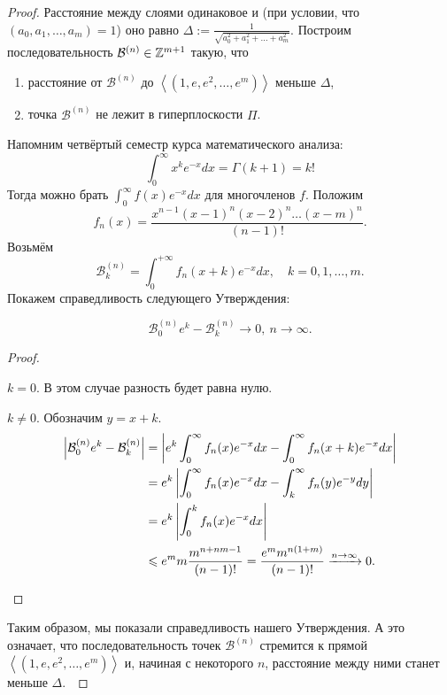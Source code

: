 \begin{proof}
    Расстояние между слоями одинаковое и (при условии, что $(a_0, a_1, \dots, a_m) = 1$) оно равно $\Delta := \frac{1}{\sqrt{a_0^2 + a_1^2 + \dots + a_m^2}}$. Построим последовательность $\mathcal{B}^{(n)} \in \mathbb{Z}^{m+1}$ такую, что
    \begin{enumerate}
        \item
            расстояние от $\mathcal{B}^{(n)}$ до $\left< \left(1, e, e^2, \dots, e^m \right) \right>$ меньше $\Delta$,
        \item
            точка $\mathcal{B}^{(n)}$ не лежит в гиперплоскости $\Pi$.
    \end{enumerate}
    Напомним четвёртый семестр курса математического анализа:
    \[
        \int_{0}^{\infty} x^ke^{-x}dx = \Gamma(k+1) = k!
    \]
    Тогда можно брать $\int_{0}^{\infty} f(x)e^{-x}dx$ для многочленов $f$. Положим 
    \[
        f_n(x) = \frac{x^{n-1}(x-1)^n(x-2)^n \dots (x-m)^n}{(n-1)!}.
    \]
    Возьмём
    \[
        \mathcal{B}_k^{(n)} = \int_{0}^{+\infty} f_n(x+k)e^{-x}dx,
        \quad 
        k = 0, 1, \dots, m.
    \]
    Покажем справедливость следующего Утверждения:
    \begin{statement}
        \[
            \mathcal{B}_0^{(n)}e^k - \mathcal{B}_k^{(n)} \to 0,\ n \to \infty.
        \]
    \end{statement}
    \begin{proof}
    \hfill
        \begin{casesp}
            \item
            $k = 0$.
                В этом случае разность будет равна нулю.
            \item
            $k \ne 0$. Обозначим $y = x + k$.
                \begin{align*} 
                    \left| \mathcal{B}_0^{(n)}e^k - \mathcal{B}_k^{(n)} \right| 
                    &= \left| e^k \int_{0}^{\infty} f_n(x)e^{-x}dx - \int_{0}^{\infty} f_n(x + k)e^{-x}dx \right| \\
                    &= e^k \left| \int_{0}^{\infty} f_n(x)e^{-x}dx - \int_{k}^{\infty} f_n(y)e^{-y}dy \right| \\
                    &= e^k \left| \int_{0}^{k} f_n(x)e^{-x}dx \right| \\
                    &\leqslant e^m m \frac{m^{n+nm-1}}{(n-1)!} = \frac{e^m m^{n(1+m)}}{(n-1)!} \xrightarrow{n \to \infty} 0.
                \end{align*}
        \end{casesp}
    \end{proof}
    \noindent
    Таким образом, мы показали справедливость нашего Утверждения. А это означает, что последовательность точек $\mathcal{B}^{(n)}$ стремится к прямой $\left< \left( 1, e, e^2, \dots, e^m \right) \right>$ и, начиная с некоторого $n$, расстояние между ними станет меньше $\Delta$.~\newline

\end{proof}
